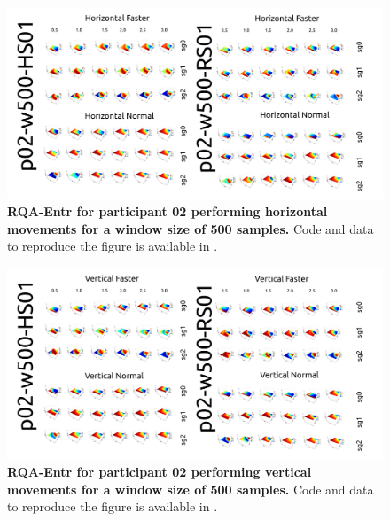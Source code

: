 \documentclass[12pt]{article}
\begin{document}
\newpage
\begin{figure}[ht!]
\centering
\includegraphics{figures/rqa/output/epsilons/rqa-epsilonsp02w500Horizontal}
    	\caption{
	{\bf RQA-Entr for participant 02 performing horizontal movements for a window size of 500 samples.}
	Code and data to reproduce the figure is available in \cite{srep2021}.
        }
    \label{fig-p02-H-w500}
\end{figure}
\begin{figure}[hb!]
\centering
\includegraphics{figures/rqa/output/epsilons/rqa-epsilonsp02w500Vertical}
    	\caption{
	{\bf RQA-Entr for participant 02 performing vertical movements for a window size of 500 samples.}
	Code and data to reproduce the figure is available in \cite{srep2021}.
        }
    \label{fig-p02-V-w500}
\end{figure}
\end{document}
